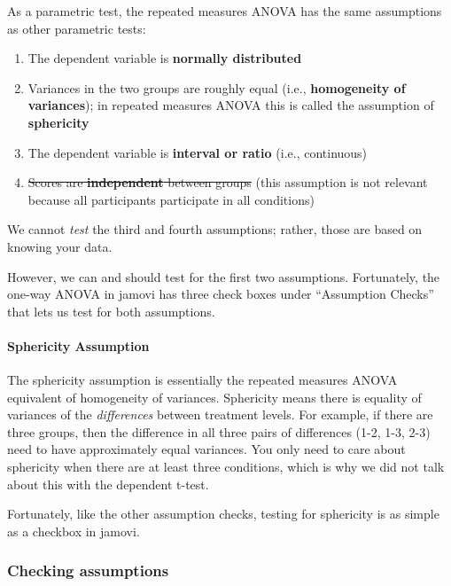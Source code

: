 \documentclass[
]{book}
\begin{document}
As a parametric test, the repeated measures ANOVA has the same assumptions as other parametric tests:

\begin{enumerate}
\def\labelenumi{\arabic{enumi}.}
\item
  The dependent variable is \textbf{normally distributed}
\item
  Variances in the two groups are roughly equal (i.e., \textbf{homogeneity of variances}); in repeated measures ANOVA this is called the assumption of \textbf{sphericity}
\item
  The dependent variable is \textbf{interval or ratio} (i.e., continuous)
\item
  \sout{Scores are \textbf{independent} between groups} (this assumption is not relevant because all participants participate in all conditions)
\end{enumerate}

We cannot \emph{test} the third and fourth assumptions; rather, those are based on knowing your data.

However, we can and should test for the first two assumptions. Fortunately, the one-way ANOVA in jamovi has three check boxes under ``Assumption Checks'' that lets us test for both assumptions.

\hypertarget{sphericity-assumption}{%
\paragraph{Sphericity Assumption}\label{sphericity-assumption}}

The sphericity assumption is essentially the repeated measures ANOVA equivalent of homogeneity of variances. Sphericity means there is equality of variances of the \emph{differences} between treatment levels. For example, if there are three groups, then the difference in all three pairs of differences (1-2, 1-3, 2-3) need to have approximately equal variances. You only need to care about sphericity when there are at least three conditions, which is why we did not talk about this with the dependent t-test.

Fortunately, like the other assumption checks, testing for sphericity is as simple as a checkbox in jamovi.

\hypertarget{checking-assumptions-5}{%
\subsubsection{Checking assumptions}\label{checking-assumptions-5}}
\end{document}
